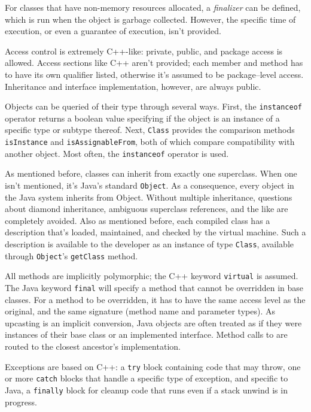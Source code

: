   For classes that have non-memory resources allocated, a \emph{finalizer} can be defined, which is run when the object is garbage collected.  However, the specific time of execution, or even a guarantee of execution, isn't provided.

  Access control is extremely C++-like: private, public, and package access is allowed.  Access sections like C++ aren't provided; each member and method has to have its own qualifier listed, otherwise it's assumed to be package--level access.  Inheritance and interface implementation, however, are always public.
  
  Objects can be queried of their type through several ways.  First, the \texttt{instanceof} operator returns a boolean value specifying if the object is an instance of a specific type or subtype thereof.  Next, \texttt{Class} provides the comparison methods \texttt{isInstance} and \texttt{isAssignableFrom}, both of which compare compatibility with another object.  Most often, the \texttt{instanceof} operator is used.

  As mentioned before, classes can inherit from exactly one superclass.  When one isn't mentioned, it's Java's standard \texttt{Object}.  As a consequence, every object in the Java system inherits from Object.  Without multiple inheritance, questions about diamond inheritance, ambiguous superclass references, and the like are completely avoided.  Also as mentioned before, each compiled class has a description that's loaded, maintained, and checked by the virtual machine.  Such a description is available to the developer as an instance of type \texttt{Class}, available through \texttt{Object}'s \texttt{getClass} method.

  All methods are implicitly polymorphic; the C++ keyword \texttt{virtual} is assumed.  The Java keyword \texttt{final} will specify a method that cannot be overridden in base classes.  For a method to be overridden, it has to have the same access level as the original, and the same signature (method name and parameter types).  As upcasting is an implicit conversion, Java objects are often treated as if they were instances of their base class or an implemented interface.  Method calls to are routed to the closest ancestor's implementation.

	Exceptions are based on C++: a \texttt{try} block containing code that may throw, one or more \texttt{catch} blocks that handle a specific type of exception, and specific to Java, a \texttt{finally} block for cleanup code that runs even if a stack unwind is in progress.

